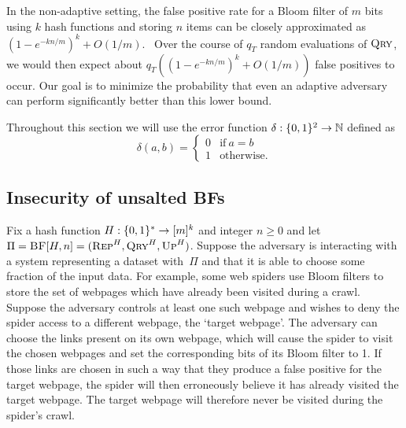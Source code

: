 
In the non-adaptive setting, the false positive rate for a Bloom filter of $m$
bits using $k$ hash functions and storing $n$ items can be closely approximated
as $(1-e^{-kn/m})^k + O(1/m)$.~\cite{kirsch2006less} Over the course of $q_T$
random evaluations of $\textnormal{\textsc{Qry}}$, we would then expect about
$q_T((1-e^{-kn/m})^k + O(1/m))$ false positives to occur. Our goal is to
minimize the probability that even an adaptive adversary can perform
significantly better than this lower bound.

%
Throughout this section we will use the error function $\delta:\{0,1\}^2\to\mathbb{N}$
defined as
\begin{equation*}
  \delta(a, b) =
  \begin{cases}
    0 & \text{if}\ a=b \\
    1 & \text{otherwise.}
  \end{cases}
\end{equation*}

\subsection{Insecurity of unsalted BFs}
Fix a hash function $H:\{0,1\}^*\to[m]^k$ and integer $n\geq0$ and
let $\Pi = \textnormal{\textsc{BF}}[H,n] = (\textnormal{\textsc{Rep}}^H, \textnormal{\textsc{Qry}}^H, \textnormal{\textsc{Up}}^H)$.
%
Suppose the adversary is interacting with a system representing a dataset
with~$\Pi$ and that it is able to choose some fraction of the input data.
For example, some web spiders use Bloom filters to store the set of webpages
which have already been visited during a crawl. Suppose the adversary controls
at least one such webpage and wishes to deny the spider access to a different
webpage, the `target webpage'. The adversary can choose the links present on its
own webpage, which will cause the spider to visit the chosen webpages and set
the corresponding bits of its Bloom filter to 1. If those links are chosen in
such a way that they produce a false positive for the target webpage, the spider
will then erroneously believe it has already visited the target webpage. The
target webpage will therefore never be visited during the spider's crawl.

